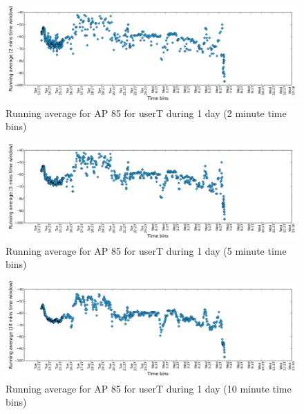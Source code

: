 \begin{figure}[!h]
\centering
\includegraphics[width
=\textwidth, height =
0.4\textwidth]{figures/rn_avg/user_1_sorted_1days_plot_85_rn_avg_sig_2.png}
\caption{Running average for AP 85 for userT during 1 day (2 minute time bins)}
\label{user_1_AP85_rn2avg_1d}
\end{figure}

\begin{figure}[!h]
\centering
\includegraphics[width
=\textwidth, height =
0.4\textwidth]{figures/rn_avg/user_1_sorted_1days_plot_85_rn_avg_sig_5.png}
\caption{Running average for AP 85 for userT during 1 day (5 minute time bins)}
\label{user_1_AP85_rn5avg_1d}
\end{figure}

\begin{figure}[!h]
\centering
\includegraphics[width
=\textwidth, height =
0.4\textwidth]{figures/rn_avg/user_1_sorted_1days_plot_85_rn_avg_sig_10.png}
\caption{Running average for AP 85 for userT during 1 day (10 minute time bins)}
\label{user_1_AP85_rn10avg_1d}
\end{figure}

